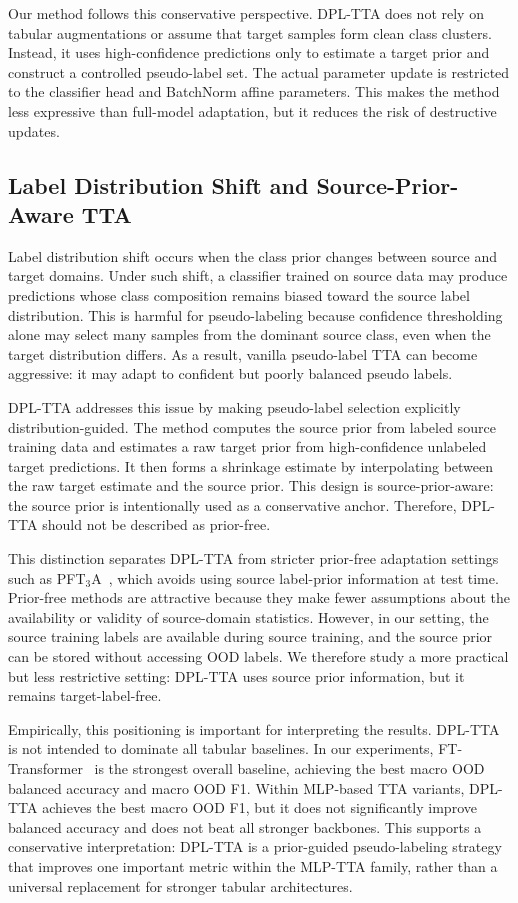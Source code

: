 \documentclass{article}
\begin{document}
Our method follows this conservative perspective. DPL-TTA does not rely on tabular augmentations or assume that target samples form clean class clusters. Instead, it uses high-confidence predictions only to estimate a target prior and construct a controlled pseudo-label set. The actual parameter update is restricted to the classifier head and BatchNorm affine parameters. This makes the method less expressive than full-model adaptation, but it reduces the risk of destructive updates.

\subsection{Label Distribution Shift and Source-Prior-Aware TTA}

Label distribution shift occurs when the class prior changes between source and target domains. Under such shift, a classifier trained on source data may produce predictions whose class composition remains biased toward the source label distribution. This is harmful for pseudo-labeling because confidence thresholding alone may select many samples from the dominant source class, even when the target distribution differs. As a result, vanilla pseudo-label TTA can become aggressive: it may adapt to confident but poorly balanced pseudo labels.

DPL-TTA addresses this issue by making pseudo-label selection explicitly distribution-guided. The method computes the source prior from labeled source training data and estimates a raw target prior from high-confidence unlabeled target predictions. It then forms a shrinkage estimate by interpolating between the raw target estimate and the source prior. This design is source-prior-aware: the source prior is intentionally used as a conservative anchor. Therefore, DPL-TTA should not be described as prior-free.

This distinction separates DPL-TTA from stricter prior-free adaptation settings such as PFT$_3$A~\citep{he2026pft3a}, which avoids using source label-prior information at test time. Prior-free methods are attractive because they make fewer assumptions about the availability or validity of source-domain statistics. However, in our setting, the source training labels are available during source training, and the source prior can be stored without accessing OOD labels. We therefore study a more practical but less restrictive setting: DPL-TTA uses source prior information, but it remains target-label-free.

Empirically, this positioning is important for interpreting the results. DPL-TTA is not intended to dominate all tabular baselines. In our experiments, FT-Transformer~\citep{gorishniy2021revisiting} is the strongest overall baseline, achieving the best macro OOD balanced accuracy and macro OOD F1. Within MLP-based TTA variants, DPL-TTA achieves the best macro OOD F1, but it does not significantly improve balanced accuracy and does not beat all stronger backbones. This supports a conservative interpretation: DPL-TTA is a prior-guided pseudo-labeling strategy that improves one important metric within the MLP-TTA family, rather than a universal replacement for stronger tabular architectures.
\end{document}
